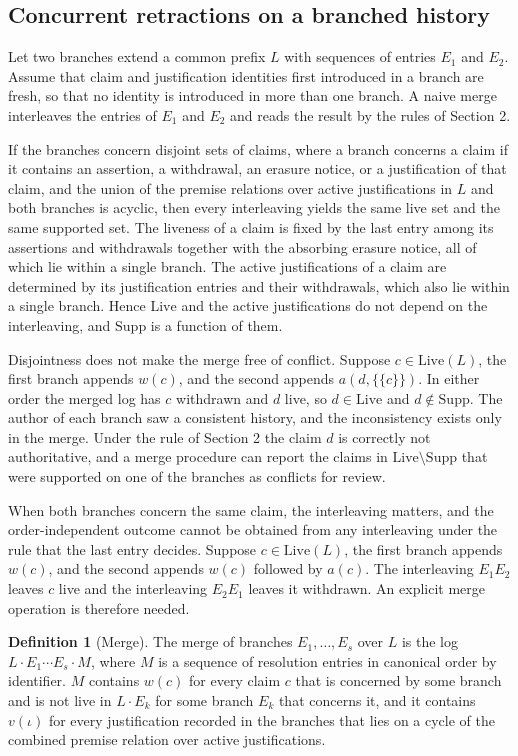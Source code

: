 \documentclass[11pt]{article}
\theoremstyle{plain}
\theoremstyle{definition}
\newtheorem{definition}{Definition}
\theoremstyle{remark}
\begin{document}
\subsection{Concurrent retractions on a branched history}
Let two branches extend a common prefix $L$ with sequences of entries $E_1$ and $E_2$. Assume that claim and justification identities first introduced in a branch are fresh, so that no identity is introduced in more than one branch. A naive merge interleaves the entries of $E_1$ and $E_2$ and reads the result by the rules of Section 2.

If the branches concern disjoint sets of claims, where a branch concerns a claim if it contains an assertion, a withdrawal, an erasure notice, or a justification of that claim, and the union of the premise relations over active justifications in $L$ and both branches is acyclic, then every interleaving yields the same live set and the same supported set. The liveness of a claim is fixed by the last entry among its assertions and withdrawals together with the absorbing erasure notice, all of which lie within a single branch. The active justifications of a claim are determined by its justification entries and their withdrawals, which also lie within a single branch. Hence $\mathrm{Live}$ and the active justifications do not depend on the interleaving, and $\mathrm{Supp}$ is a function of them.

Disjointness does not make the merge free of conflict. Suppose $c\in\mathrm{Live}(L)$, the first branch appends $w(c)$, and the second appends $a(d,\{\{c\}\})$. In either order the merged log has $c$ withdrawn and $d$ live, so $d\in\mathrm{Live}$ and $d\notin\mathrm{Supp}$. The author of each branch saw a consistent history, and the inconsistency exists only in the merge. Under the rule of Section 2 the claim $d$ is correctly not authoritative, and a merge procedure can report the claims in $\mathrm{Live}\setminus\mathrm{Supp}$ that were supported on one of the branches as conflicts for review.

When both branches concern the same claim, the interleaving matters, and the order-independent outcome cannot be obtained from any interleaving under the rule that the last entry decides. Suppose $c\in\mathrm{Live}(L)$, the first branch appends $w(c)$, and the second appends $w(c)$ followed by $a(c)$. The interleaving $E_1E_2$ leaves $c$ live and the interleaving $E_2E_1$ leaves it withdrawn. An explicit merge operation is therefore needed.

\begin{definition}[Merge]
The merge of branches $E_1,\dots,E_s$ over $L$ is the log $L\cdot E_1\cdots E_s\cdot M$, where $M$ is a sequence of resolution entries in canonical order by identifier. $M$ contains $w(c)$ for every claim $c$ that is concerned by some branch and is not live in $L\cdot E_k$ for some branch $E_k$ that concerns it, and it contains $v(\iota)$ for every justification recorded in the branches that lies on a cycle of the combined premise relation over active justifications.
\end{definition}
\end{document}
